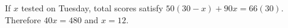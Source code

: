 If $x$ tested on Tuesday, total scores satisfy $50(30-x)+90x=66(30)$. Therefore $40x=480$ and $\boxed{x=12}$.
